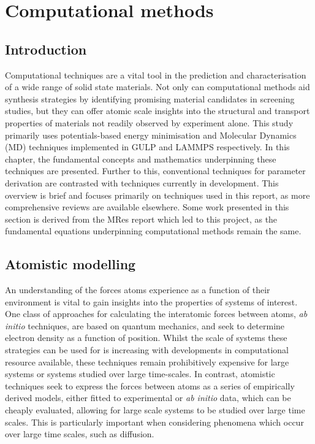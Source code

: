 \chapter{Computational methods}
\section{Introduction}
Computational techniques are a vital tool in the prediction and characterisation of a wide range of solid state materials.
Not only can computational methods aid synthesis strategies by identifying promising material candidates in screening studies, but they can offer atomic scale insights into the structural and transport properties of materials not readily observed by experiment alone.
This study primarily uses potentials-based energy minimisation and Molecular Dynamics (MD)  techniques implemented in GULP \cite{Gale2003} and LAMMPS \cite{StevePlimton1995} respectively.
In this chapter, the fundamental concepts and mathematics underpinning these techniques are presented.
Further to this, conventional techniques for parameter derivation are contrasted with techniques currently in development.
This overview is brief and focuses primarily on techniques used in this report, as more comprehensive reviews are available elsewhere. \cite{Gale2003, Jensen2007, Catlow2013}
Some work presented in this section is derived from the MRes report which led to this project, as the fundamental equations underpinning computational methods remain the same.

\section{Atomistic modelling}
An understanding of the forces atoms experience as a function of their environment is vital to gain insights into the properties of systems of interest.
One class of approaches for calculating the interatomic forces between atoms, \textit{ab initio} techniques, are based on quantum mechanics, and seek to determine electron density as a function of position. Whilst the scale of systems these strategies can be used for is increasing with developments in computational resource available, these techniques remain prohibitively expensive for large systems or systems studied over large time-scales.
In contrast, atomistic techniques seek to express the forces between atoms as a series of empirically derived models, either fitted to experimental or \textit{ab initio} data, which can be cheaply evaluated, allowing for large scale systems to be studied over large time scales. 
This is particularly important when considering phenomena which occur over large time scales, such as diffusion. 

